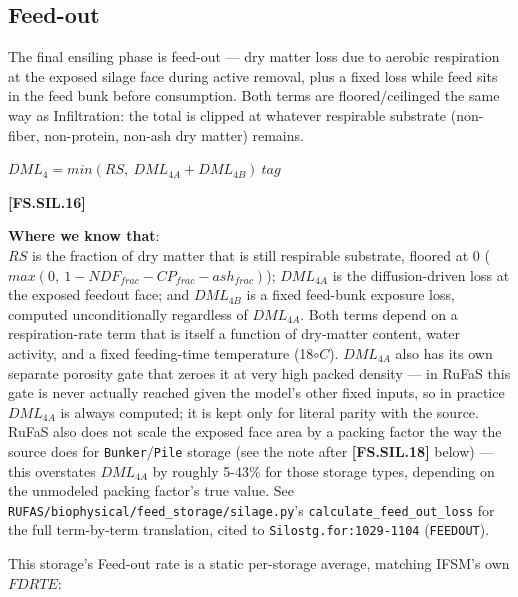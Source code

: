 \begin{refsection}
\subsection{Feed-out}
The final ensiling phase is feed-out — dry matter loss due to aerobic respiration at the exposed
silage face during active removal, plus a fixed loss while feed sits in the feed bunk before
consumption. Both terms are floored/ceilinged the same way as Infiltration: the total is clipped at
whatever respirable substrate (non-fiber, non-protein, non-ash dry matter) remains.
\vspace{0.2cm}

        \begin{center}
        \(DML_{4} = min(RS,\ DML_{4A} + DML_{4B})\ tag\)
    \end{center}
        \vspace{0.5cm}

            {\raggedleft \textbf{[FS.SIL.16]}\par}
        \vspace{0.5cm}

\textbf{Where we know that}: \\ \(RS\) is the fraction of dry matter that is still respirable
substrate, floored at 0 (\(max(0,\ 1 - NDF_{frac} - CP_{frac} - ash_{frac})\)); \(DML_{4A}\) is the
diffusion-driven loss at the exposed feedout face; and \(DML_{4B}\) is a fixed feed-bunk exposure loss,
computed unconditionally regardless of \(DML_{4A}\). Both terms depend on a respiration-rate term that
is itself a function of dry-matter content, water activity, and a fixed feeding-time temperature
(18\(\circ C\)). \(DML_{4A}\) also has its own separate porosity gate that zeroes it at very high
packed density — in RuFaS this gate is never actually reached given the model's other fixed inputs, so
in practice \(DML_{4A}\) is always computed; it is kept only for literal parity with the source. RuFaS
also does not scale the exposed face area by a packing factor the way the source does for
\texttt{Bunker}/\texttt{Pile} storage (see the note after \textbf{[FS.SIL.18]} below) — this
overstates \(DML_{4A}\) by roughly 5-43\% for those storage types, depending on the unmodeled packing
factor's true value. See \texttt{RUFAS/biophysical/feed\_storage/silage.py}'s
\texttt{calculate\_feed\_out\_loss} for the full term-by-term translation, cited to
\texttt{Silostg.for:1029-1104} (\texttt{FEEDOUT}).
\vspace{0.2cm}

This storage's Feed-out rate is a static per-storage average, matching IFSM's own \(FDRTE\):
\vspace{0.2cm}


\end{refsection}
